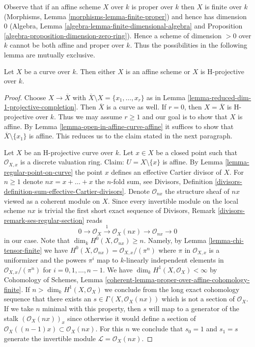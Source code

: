 \noindent
Observe that if an affine scheme $X$ over $k$ is proper over $k$
then $X$ is finite over $k$ (Morphisms, Lemma
\ref{morphisms-lemma-finite-proper}) and hence has
dimension $0$
(Algebra, Lemma \ref{algebra-lemma-finite-dimensional-algebra} and
Proposition \ref{algebra-proposition-dimension-zero-ring}).
Hence a scheme of dimension $> 0$ over $k$ cannot be both affine and
proper over $k$. Thus the possibilities in the following lemma are
mutually exclusive.

\begin{lemma}
\label{lemma-curve-affine-projective}
Let $X$ be a curve over $k$. Then either $X$ is an affine scheme or $X$
is H-projective over $k$.
\end{lemma}

\begin{proof}
Choose $X \to \overline{X}$ with
$\overline{X} \setminus X = \{x_1, \ldots, x_r\}$ as in
Lemma \ref{lemma-reduced-dim-1-projective-completion}.
Then $\overline{X}$ is a curve as well.
If $r = 0$, then $X = \overline{X}$ is H-projective over $k$.
Thus we may assume $r \geq 1$ and our goal is to show that
$X$ is affine. By Lemma \ref{lemma-open-in-affine-curve-affine}
it suffices to show that $\overline{X} \setminus \{x_1\}$ is affine.
This reduces us to the claim stated in the next paragraph.

\medskip\noindent
Let $X$ be an H-projective curve over $k$. Let $x \in X$ be a closed point
such that $\mathcal{O}_{X, x}$ is a discrete valuation ring. Claim:
$U = X \setminus \{x\}$ is affine. By Lemma \ref{lemma-regular-point-on-curve}
the point $x$ defines an effective Cartier divisor of $X$.
For $n \geq 1$ denote $nx = x + \ldots + x$ the $n$-fold sum, see
Divisors, Definition \ref{divisors-definition-sum-effective-Cartier-divisors}.
Denote $\mathcal{O}_{nx}$ the structure sheaf of $nx$ viewed as a
coherent module on $X$.
Since every invertible module on the local scheme $nx$ is trivial
the first short exact sequence of
Divisors, Remark \ref{divisors-remark-ses-regular-section}
reads
$$
0 \to \mathcal{O}_X
\xrightarrow{1} \mathcal{O}_X(nx) \to \mathcal{O}_{nx} \to 0
$$
in our case. Note that $\dim_k H^0(X, \mathcal{O}_{nx}) \geq n$.
Namely, by Lemma \ref{lemma-chi-tensor-finite} we have
$H^0(X, \mathcal{O}_{nx}) = \mathcal{O}_{X, x}/(\pi^n)$ where $\pi$ in
$\mathcal{O}_{X, x}$ is a uniformizer and the powers $\pi^i$ map to
$k$-linearly independent elements in $\mathcal{O}_{X, x}/(\pi^n)$
for $i = 0, 1, \ldots, n - 1$. We have $\dim_k H^1(X, \mathcal{O}_X) < \infty$
by Cohomology of Schemes, Lemma
\ref{coherent-lemma-proper-over-affine-cohomology-finite}.
If $n > \dim_k H^1(X, \mathcal{O}_X)$
we conclude from the long exact cohomology sequence
that there exists an $s \in \Gamma(X, \mathcal{O}_X(nx))$
which is not a section of $\mathcal{O}_X$.
If we take $n$ minimal with this property, then $s$ will
map to a generator of the stalk
$\left(\mathcal{O}_X(nx)\right)_x$ since otherwise it would
define a section of $\mathcal{O}_X((n - 1)x) \subset \mathcal{O}_X(nx)$.
For this $n$ we conclude that $s_0 = 1$ and $s_1 = s$
generate the invertible module $\mathcal{L} = \mathcal{O}_X(nx)$.


\end{proof}
